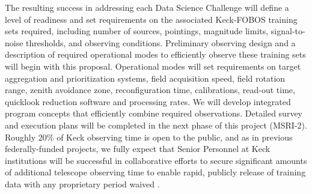 \documentclass[oneside,11pt]{amsart}
\begin{document}
The resulting success in addressing each Data Science Challenge will define a level of readiness and set requirements
on the associated Keck-FOBOS training sets required, including number of sources, pointings, magnitude limits,
signal-to-noise thresholds, and observing conditions.  Preliminary observing design and a description of required
operational modes to efficiently observe these training sets will begin with this proposal.  Operational modes will set
requirements on target aggregation and prioritization systems, field acquisition speed, field rotation range, zenith
avoidance zone, reconfiguration time, calibrations, read-out time, quicklook reduction software and processing rates.
We will develop integrated program concepts that efficiently combine required observations.  Detailed survey and
execution plans will be completed in the next phase of this project (MSRI-2).  Roughly 20\% of Keck observing time is
open to the public, and as in previous federally-funded projects, we fully expect that Senior Personnel at Keck
institutions will be successful in collaborative efforts to secure significant amounts of additional telescope
observing time to enable rapid, publicly release of training data with any proprietary period waived
\citep[e.g.,][]{newman13}.


\end{document}

